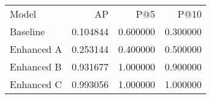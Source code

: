 \begin{tabular}{lrrr}
Model & AP & P@5 & P@10 \\
Baseline & 0.104844 & 0.600000 & 0.300000 \\
Enhanced A & 0.253144 & 0.400000 & 0.500000 \\
Enhanced B & 0.931677 & 1.000000 & 0.900000 \\
Enhanced C & 0.993056 & 1.000000 & 1.000000 \\
\end{tabular}
